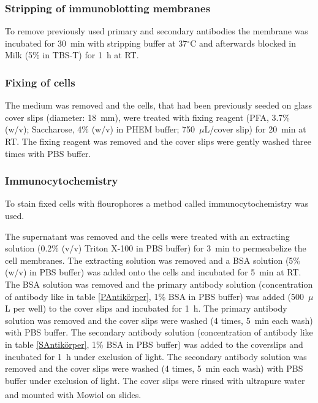 \documentclass[a4paper,11pt,bibtotocnumbered]{article}
\begin{document}
 

\subsubsection{Stripping of immunoblotting membranes}

To remove previously used primary and secondary antibodies the membrane was incubated for 30~min with stripping buffer at 37$^\circ$C and afterwards blocked in Milk (5\% in TBS-T) for 1~h at RT. 


\subsubsection{Fixing of cells}

The medium was removed and the cells, that had been previously seeded on glass cover slips (diameter: 18~mm), were treated with fixing reagent 
(PFA, 3.7\% (w/v); Saccharose, 4\% (w/v) in PHEM buffer; 750~$\mu$L/cover slip) for 20~min at RT. The fixing reagent was removed and the cover slips were gently washed three times with PBS buffer.



\subsubsection{Immunocytochemistry}

To stain fixed cells with flourophores a method called immunocytochemistry was used.

The supernatant was removed and the cells were treated with an extracting solution (0.2\% (v/v) Triton X-100 in PBS buffer) for 3~min to permeabelize the cell membranes. The extracting solution was removed and a BSA solution (5\% (w/v) in PBS buffer) was added onto the cells and incubated for 5~min at RT. The BSA solution was removed and the primary antibody solution (concentration of antibody like in table \ref{PAntikörper}, 1\% BSA in PBS buffer) was added (500~$\mu$L per well) to the cover slips and incubated for 1~h. The primary antibody solution was removed and the cover slips were washed (4 times, 5~min each wash) with PBS buffer. The secondary antibody solution (concentration of antibody like in table \ref{SAntikörper}, 1\% BSA in PBS buffer) was added to the coverslips and incubated for 1~h under exclusion of light. The secondary antibody solution was removed and the cover slips were washed (4 times, 5~min each wash) with PBS buffer under exclusion of light. The cover slips were rinsed with ultrapure water and mounted with Mowiol\textsuperscript{\textregistered} on slides.
\end{document}
